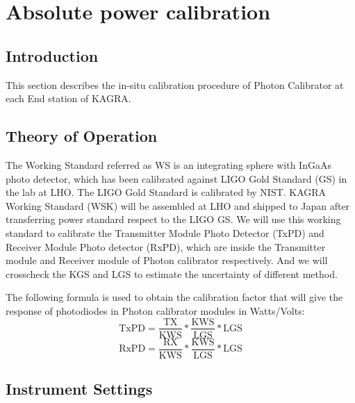 
\chapter{Absolute power calibration} %
\label{Chapter5} %
\section{Introduction}
\label{sec:intro}
This section describes the in-situ calibration procedure of Photon Calibrator at each End station of KAGRA.

\section{Theory of Operation}

The Working Standard referred as WS  is an integrating sphere with InGaAs photo detector, which has been calibrated against LIGO Gold Standard (GS) in the lab at LHO. The LIGO Gold Standard is calibrated by NIST. 
KAGRA Working Standard (WSK) will be assembled at LHO and shipped to Japan 
after transferring power standard respect to the LIGO GS. 
We will use this working standard to calibrate the Transmitter Module Photo Detector (TxPD) and Receiver Module Photo detector (RxPD), which are inside the Transmitter module and Receiver module of Photon calibrator respectively. And we will crosscheck the KGS and LGS to estimate the uncertainty of different method.

The following formula is used to obtain the calibration factor that will give the response of photodiodes in Photon calibrator modules in Watts/Volts:
\
\begin{equation}
\mathrm{TxPD} = \frac{\mathrm{TX}}{\mathrm{KWS}}*\frac{\mathrm{KWS}}{\mathrm{LGS}}*\mathrm{LGS}
\end{equation}
\begin{equation}
\mathrm{RxPD} = \frac{\mathrm{RX}}{\mathrm{KWS}}*\frac{\mathrm{KWS}}{\mathrm{LGS}}*\mathrm{LGS}
\end{equation}

\section{Instrument Settings}

